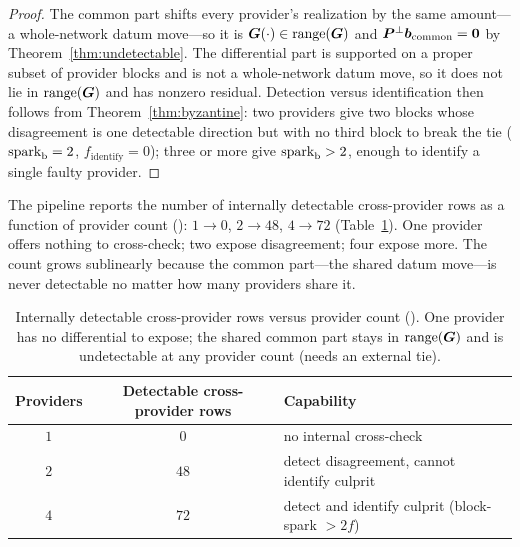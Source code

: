 \begin{proof}
The common part shifts every provider's realization by the same amount---a whole-network
datum move---so it is $\bm{G}(\cdot)\in\operatorname{range}(\bm{G})$ and $\bm{P}^{\perp}\bm{b}_{\mathrm{common}}=\bm0$
by Theorem~\ref{thm:undetectable}. The differential part is supported on a proper subset of
provider blocks and is not a whole-network datum move, so it does not lie in $\operatorname{range}(\bm{G})$
and has nonzero residual. Detection versus identification then follows from
Theorem~\ref{thm:byzantine}: two providers give two blocks whose disagreement is one
detectable direction but with no third block to break the tie ($\operatorname{spark}_{\mathrm b}=2$,
$f_{\mathrm{identify}}=0$); three or more give $\operatorname{spark}_{\mathrm b}>2$, enough to identify a
single faulty provider.
\end{proof}

The pipeline reports the number of internally detectable cross-provider rows as a function
of provider count (\Modelled{}): $1\to0$, $2\to48$, $4\to72$ (Table~\ref{tab:provider}). One
provider offers nothing to cross-check; two expose disagreement; four expose more. The count
grows sublinearly because the common part---the shared datum move---is never detectable no
matter how many providers share it.

\begin{table}[t]
\centering
\caption{Internally detectable cross-provider rows versus provider count (\Modelled{}). One
provider has no differential to expose; the shared common part stays in $\operatorname{range}(\bm{G})$ and is
undetectable at any provider count (needs an external tie).}
\label{tab:provider}
\small
\setlength{\tabcolsep}{10pt}
\begin{tabular}{@{}ccl@{}}
\toprule
\textbf{Providers} & \textbf{Detectable cross-provider rows} & \textbf{Capability} \\
\midrule
$1$ & $0$  & no internal cross-check \\
$2$ & $48$ & detect disagreement, cannot identify culprit \\
$4$ & $72$ & detect and identify culprit (block-spark $>2f$) \\
\bottomrule
\end{tabular}
\end{table}
